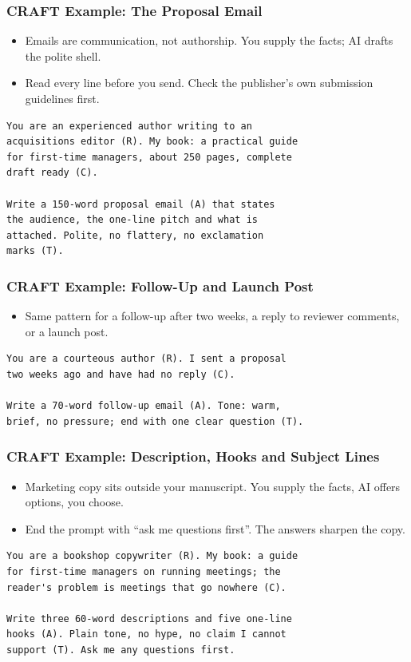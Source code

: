 \begin{frame}[fragile]\frametitle{CRAFT Example: The Proposal Email}
\begin{itemize}
\item Emails are communication, not authorship. You supply the facts; AI drafts the polite shell.
\item Read every line before you send. Check the publisher's own submission guidelines first.
\end{itemize}
\begin{lstlisting}[language=HTML]
You are an experienced author writing to an
acquisitions editor (R). My book: a practical guide
for first-time managers, about 250 pages, complete
draft ready (C).

Write a 150-word proposal email (A) that states
the audience, the one-line pitch and what is
attached. Polite, no flattery, no exclamation
marks (T).
\end{lstlisting}
\end{frame}

\begin{frame}[fragile]\frametitle{CRAFT Example: Follow-Up and Launch Post}
\begin{itemize}
\item Same pattern for a follow-up after two weeks, a reply to reviewer comments, or a launch post.
\end{itemize}
\begin{lstlisting}[language=HTML]
You are a courteous author (R). I sent a proposal
two weeks ago and have had no reply (C).

Write a 70-word follow-up email (A). Tone: warm,
brief, no pressure; end with one clear question (T).
\end{lstlisting}
\end{frame}

\begin{frame}[fragile]\frametitle{CRAFT Example: Description, Hooks and Subject Lines}
\begin{itemize}
\item Marketing copy sits outside your manuscript. You supply the facts, AI offers options, you choose.
\item End the prompt with ``ask me questions first''. The answers sharpen the copy.
\end{itemize}
\begin{lstlisting}[language=HTML]
You are a bookshop copywriter (R). My book: a guide
for first-time managers on running meetings; the
reader's problem is meetings that go nowhere (C).

Write three 60-word descriptions and five one-line
hooks (A). Plain tone, no hype, no claim I cannot
support (T). Ask me any questions first.
\end{lstlisting}
\end{frame}

